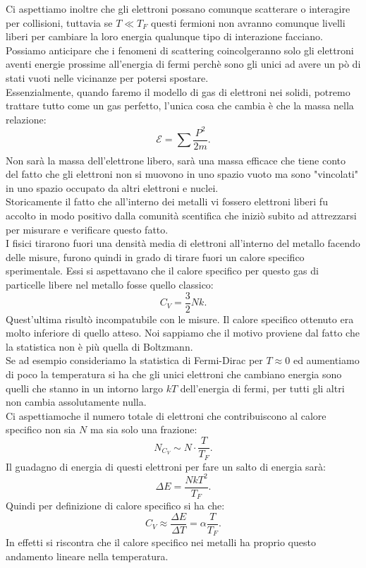 Ci aspettiamo inoltre che gli elettroni possano comunque scatterare o interagire per collisioni, tuttavia se $T \ll T_{F}$ questi fermioni non avranno comunque livelli liberi per cambiare la loro energia qualunque tipo di interazione facciano. \\
Possiamo anticipare che i fenomeni di scattering coincolgeranno solo gli elettroni aventi energie prossime all'energia di fermi perchè sono gli unici ad avere un pò di stati vuoti nelle vicinanze per potersi spostare.\\
Essenzialmente, quando faremo il modello di gas di elettroni nei solidi, potremo trattare tutto come un gas perfetto, l'unica cosa che cambia è che la massa nella relazione:
\[
	\mathcal{E} = \sum_{}^{} \frac{P^2}{2m}
.\] 
Non sarà la massa dell'elettrone libero, sarà una massa efficace che tiene conto del fatto che gli elettroni non si muovono in uno spazio vuoto ma sono "vincolati" in uno spazio occupato da altri elettroni e nuclei.\\
Storicamente il fatto che all'interno dei metalli vi fossero elettroni liberi fu accolto in modo positivo dalla comunità scentifica che iniziò subito ad attrezzarsi per misurare e verificare questo fatto.\\ 
I fisici tirarono fuori una densità media di elettroni all'interno del metallo facendo delle misure, furono quindi in grado di tirare fuori un calore specifico sperimentale. Essi si aspettavano che il calore specifico per questo gas di particelle libere nel metallo fosse quello classico: 
\[
	C_{V}= \frac{3}{2}Nk
.\] 
Quest'ultima risultò incompatubile con le misure. Il calore specifico ottenuto era molto inferiore di quello atteso. Noi sappiamo che il motivo proviene dal fatto che la statistica non è più quella di Boltzmann. \\
Se ad esempio consideriamo la statistica di Fermi-Dirac per $T \approx 0$ ed aumentiamo di poco la temperatura si ha che gli unici elettroni che cambiano energia sono quelli che stanno in un intorno largo $kT$ dell'energia di fermi, per tutti gli altri non cambia assolutamente nulla.\\ 
Ci aspettiamoche il numero totale di elettroni che contribuiscono al calore specifico non sia $N$ ma sia solo una frazione:
\[
	N_{C_{V}} \sim N\cdot \frac{T}{T_{F}}
.\] 
Il guadagno di energia di questi elettroni per fare un salto di energia sarà:
\[
	\Delta E = \frac{N kT^2}{T_{F}}
.\] 
Quindi per definizione di calore specifico si ha che:
\[
	C_{V} \approx \frac{\Delta E}{\Delta  T} = \alpha \frac{T}{T_{F}} 
.\] 
In effetti si riscontra che il calore specifico nei metalli ha proprio questo andamento lineare nella temperatura.\\
